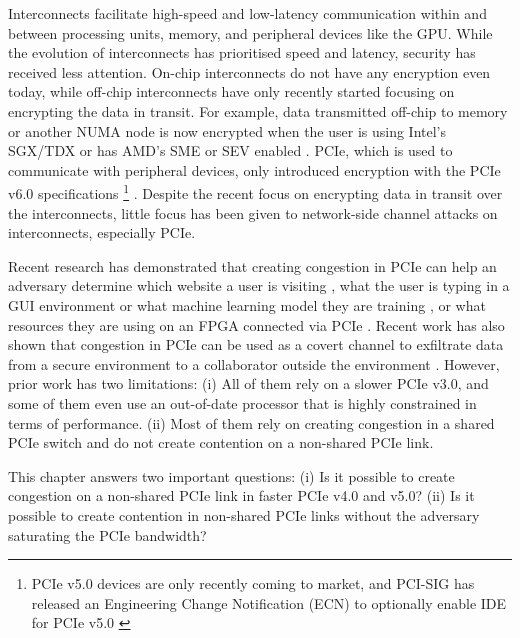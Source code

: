 
Interconnects facilitate high-speed and low-latency communication within and between processing units, memory, and peripheral devices like the GPU.
While the evolution of interconnects has prioritised speed and latency, security has received less attention.
On-chip interconnects do not have any encryption even today, while off-chip interconnects have only recently started focusing on encrypting the data in transit.
For example, data transmitted off-chip to memory or another NUMA node is now encrypted when the user is using Intel's SGX/TDX or has AMD's SME or SEV enabled \cite{intel_upi_encryption, amd_gen_5_arch}.
PCIe, which is used to communicate with peripheral devices, only introduced encryption with the PCIe v6.0 specifications 
\footnote{PCIe v5.0 devices are only recently coming to market, and PCI-SIG has released an Engineering Change Notification (ECN) to optionally enable IDE for PCIe v5.0 \cite{pcie_ide_v5_ecn}}
\cite{pcie_ide_v6}.
Despite the recent focus on encrypting data in transit over the interconnects, little focus has been given to network-side channel attacks on interconnects, especially PCIe.

Recent research has demonstrated that creating congestion in PCIe can help an adversary determine which website a user is visiting \cite{tan2021invisible, side2022lockeddown}, what the user is typing in a GUI environment or what machine learning model they are training \cite{tan2021invisible}, or what resources they are using on an FPGA connected via PCIe \cite{giechaskiel2022cross}.
Recent work has also shown that congestion in PCIe can be used as a covert channel to exfiltrate data from a secure environment to a collaborator outside the environment \cite{giechaskiel2022cross, khaliq2021timing}.
However, prior work has two limitations: 
(i) All of them rely on a slower PCIe v3.0, and some of them even use an out-of-date processor that is highly constrained in terms of performance. 
(ii) Most of them rely on creating congestion in a shared PCIe switch and do not create contention on a non-shared PCIe link.

This chapter answers two important questions:
(i) Is it possible to create congestion on a non-shared PCIe link in faster PCIe v4.0 and v5.0?
(ii) Is it possible to create contention in non-shared PCIe links without the adversary saturating the PCIe bandwidth?


